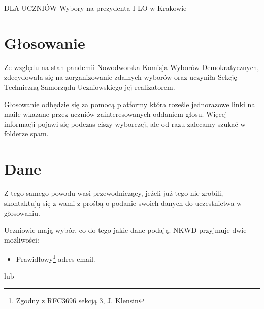\pagestyle{fancy}


\unappendix

\begin{center}
  \LARGE{ \textsc{DLA UCZNIÓW}}
  \vspace{0.3cm}
  \hline
  \vspace{1.2cm}
  Wybory na prezydenta I LO w Krakowie
  \vspace{0.8cm}
\end{center}

\section{Głosowanie}
\normalsize
\normalshape

\hspace{0.5cm} Ze względu na stan pandemii Nowodworska Komisja Wyborów Demokratycznych, zdecydowała się na zorganizowanie zdalnych wyborów oraz uczyniła Sekcję Techniczną Samorządu Uczniowskiego jej realizatorem. \par
Głosowanie odbędzie się za pomocą platformy która roześle jednorazowe linki na maile wkazane przez uczniów zainteresowanych oddaniem głosu. Więcej informacji pojawi się podczas ciszy wyborczej, ale od razu zalecamy szukać w folderze spam.

\section{Dane}

\hspace{0.5cm} Z tego samego powodu wasi przewodniczący, jeżeli już tego nie zrobili, skontaktują się z wami z prośbą o podanie swoich danych do uczestnictwa w głosowaniu.\par
\vspace{0.3cm}
Uczniowie mają wybór, co do tego jakie dane podają. NKWD przyjmuje dwie możliwości:

\begin{itemize}
  \item Prawidłowy\footnote{Zgodny z \href{https://tools.ietf.org/html/rfc3696}{RFC3696 sekcją 3, J. Klensin}} adres email.
\end{itemize}

\vspace{-0.3cm}
\hspace{1cm} lub
\vspace{-0.3cm}

